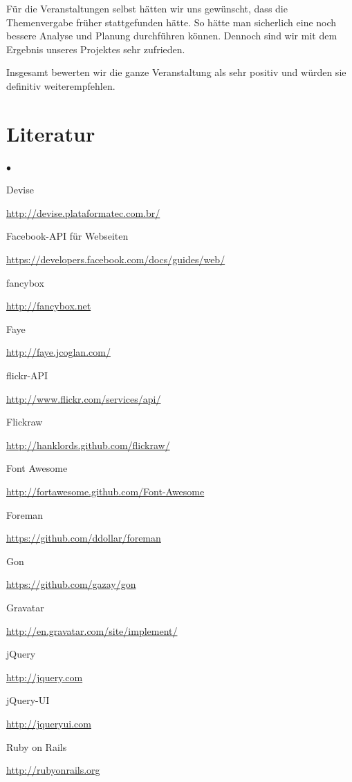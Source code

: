 \documentclass[10pt,a4paper]{book}
\begin{document}
Für die Veranstaltungen selbst hätten wir uns gewünscht, dass die Themenvergabe früher stattgefunden hätte. So hätte man sicherlich eine noch bessere Analyse und Planung durchführen können. Dennoch sind wir mit dem Ergebnis unseres Projektes sehr zufrieden.

Insgesamt bewerten wir die ganze Veranstaltung als sehr positiv und würden sie definitiv weiterempfehlen.
\chapter{Literatur}
\begin{list}{$\bullet$}{}
\item Devise

\href{http://devise.plataformatec.com.br/}{http://devise.plataformatec.com.br/}
\item Facebook-API für Webseiten

\href{https://developers.facebook.com/docs/guides/web/}{https://developers.facebook.com/docs/guides/web/}
\item fancybox

\href{http://fancybox.net}{http://fancybox.net}
\item Faye

\href{http://faye.jcoglan.com/}{http://faye.jcoglan.com/}
\item flickr-API

\href{http://www.flickr.com/services/api/}{http://www.flickr.com/services/api/}
\item Flickraw

\href{http://hanklords.github.com/flickraw/}{http://hanklords.github.com/flickraw/}
\item Font Awesome

\href{http://fortawesome.github.com/Font-Awesome}{http://fortawesome.github.com/Font-Awesome}
\item Foreman

\href{https://github.com/ddollar/foreman}{https://github.com/ddollar/foreman}
\item Gon

\href{https://github.com/gazay/gon}{https://github.com/gazay/gon}
\item Gravatar

\href{http://en.gravatar.com/site/implement/}{http://en.gravatar.com/site/implement/}
\item jQuery

\href{http://jquery.com}{http://jquery.com}
\item jQuery-UI

\href{http://jqueryui.com}{http://jqueryui.com}
\item Ruby on Rails

\href{http://rubyonrails.org}{http://rubyonrails.org}
\end{list}
\end{document}
